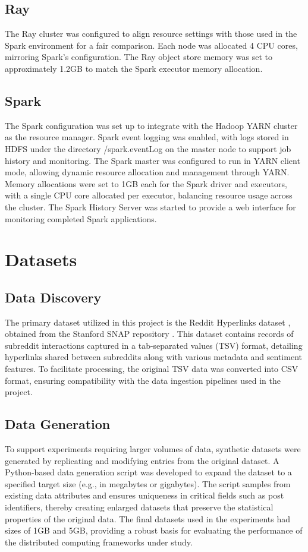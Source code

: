 \documentclass[conference]{IEEEtran}
\begin{document}
\subsection{Ray}
The Ray cluster was configured to align resource settings with those
used in the Spark environment for a fair comparison. Each node was
allocated 4 CPU cores, mirroring Spark’s configuration. The Ray object store
memory was set to approximately 1.2GB to match the Spark executor memory
allocation.

\subsection{Spark}
The Spark configuration was set up to integrate with the Hadoop YARN
cluster as the resource manager. Spark event logging was enabled, with
logs stored in HDFS under the directory /spark.eventLog on the master node to
support job history and monitoring. The Spark master was configured to
run in YARN client mode, allowing dynamic resource allocation and management
through YARN. Memory allocations were set to 1GB each for the Spark
driver and executors, with a single CPU core allocated per executor,
balancing resource usage across the cluster. The Spark History Server was
started to provide a web interface for monitoring completed Spark applications.


\section{Datasets}

\subsection{Data Discovery}
The primary dataset utilized in this project is the Reddit Hyperlinks dataset \cite{kumar2018community},
obtained from the Stanford SNAP repository \cite{reddit_snap}. This dataset contains records of
subreddit interactions captured in a tab-separated values (TSV) format,
detailing hyperlinks shared between subreddits along with various metadata and
sentiment features. To facilitate processing, the original TSV data was
converted into CSV format, ensuring compatibility with the data ingestion
pipelines used in the project.

\subsection{Data Generation}
To support experiments requiring larger volumes of data, synthetic datasets
were generated by replicating and modifying entries from the original dataset.
A Python-based data generation script was developed to expand the dataset to a
specified target size (e.g., in megabytes or gigabytes). The script samples
from existing data attributes and ensures uniqueness in critical fields such
as post identifiers, thereby creating enlarged datasets that preserve the
statistical properties of the original data. The final datasets used in the
experiments had sizes of 1GB and 5GB, providing a robust basis for evaluating
the performance of the distributed computing frameworks under study.
\end{document}

